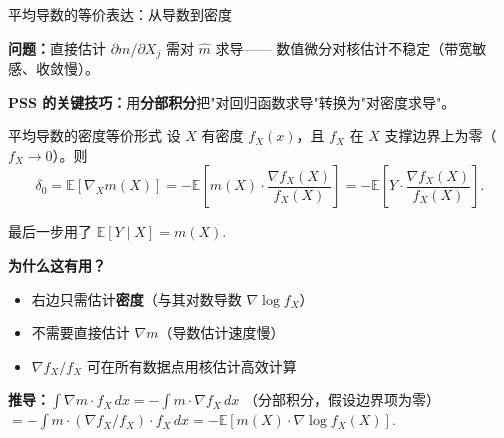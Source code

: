 \documentclass[aspectratio=169, 10pt]{beamer}
\begin{document}
\begin{frame}{平均导数的等价表达：从导数到密度}

  \textbf{问题：}直接估计 $\partial m / \partial X_j$ 需对 $\hat m$ 求导——
  数值微分对核估计不稳定（带宽敏感、收敛慢）。

  \textbf{PSS 的关键技巧：}用\textbf{分部积分}把"对回归函数求导"转换为"对密度求导"。

  \begin{definitionbox}{{平均导数的密度等价形式}}
    设 $X$ 有密度 $f_X(x)$，且 $f_X$ 在 $X$ 支撑边界上为零（$f_X \to 0$）。则
    $$\delta_0 = \mathbb{E}[\nabla_X m(X)]
    = -\mathbb{E}\!\left[m(X) \cdot \frac{\nabla f_X(X)}{f_X(X)}\right]
    = -\mathbb{E}\!\left[Y \cdot \frac{\nabla f_X(X)}{f_X(X)}\right].$$

    最后一步用了 $\mathbb{E}[Y \mid X] = m(X)$.
  \end{definitionbox}

  \begin{keybox}
    \textbf{为什么这有用？}
    \begin{itemize}\setlength{\itemsep}{1pt}
      \item 右边只需估计\textbf{密度}（与其对数导数 $\nabla \log f_X$）
      \item 不需要直接估计 $\nabla m$（导数估计速度慢）
      \item $\nabla f_X / f_X$ 可在所有数据点用核估计高效计算
    \end{itemize}
  \end{keybox}

  \textbf{推导：}$\int \nabla m \cdot f_X \, dx = -\int m \cdot \nabla f_X \, dx$
  （分部积分，假设边界项为零）$= -\int m \cdot (\nabla f_X / f_X) \cdot f_X \, dx
  = -\mathbb{E}[m(X) \cdot \nabla \log f_X(X)]$.

\end{frame}
\end{document}
